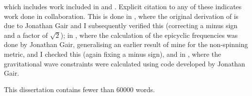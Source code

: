 which includes work included in  and . Explicit citation to any of these indicates work done in collaboration. This is done in , where the original derivation of  is due to Jonathan Gair and I subsequently verified this (correcting a minus sign and a factor of $\sqrt{2}$); in , where the calculation of the epicyclic frequencies was done by Jonathan Gair, generalising an earlier result of mine for the non-spinning metric, and I checked this (again fixing a minus sign), and in , where the gravitational wave constraints were calculated using code developed by Jonathan Gair.

This dissertation contains fewer than $60000$ words.
